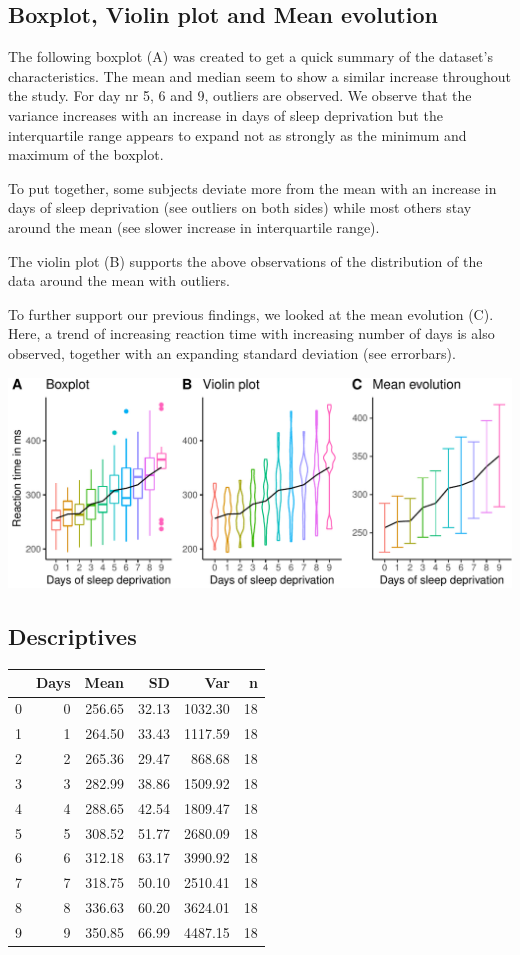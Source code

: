 \documentclass[
]{article}
\begin{document}
\hypertarget{boxplot-violin-plot-and-mean-evolution}{%
\subsection{Boxplot, Violin plot and Mean
evolution}\label{boxplot-violin-plot-and-mean-evolution}}

The following boxplot (A) was created to get a quick summary of the
dataset's characteristics. The mean and median seem to show a similar
increase throughout the study. For day nr 5, 6 and 9, outliers are
observed. We observe that the variance increases with an increase in
days of sleep deprivation but the interquartile range appears to expand
not as strongly as the minimum and maximum of the boxplot.

To put together, some subjects deviate more from the mean with an
increase in days of sleep deprivation (see outliers on both sides) while
most others stay around the mean (see slower increase in interquartile
range).

The violin plot (B) supports the above observations of the distribution
of the data around the mean with outliers.

To further support our previous findings, we looked at the mean
evolution (C). Here, a trend of increasing reaction time with increasing
number of days is also observed, together with an expanding standard
deviation (see errorbars).

\begin{center}\includegraphics{common_sleep_files/figure-latex/boxplot-1} \end{center}

\hypertarget{descriptives}{%
\subsection{Descriptives}\label{descriptives}}

\begin{longtable}[]{@{}lrrrrr@{}}
\toprule
& Days & Mean & SD & Var & n\tabularnewline
\midrule
\endhead
0 & 0 & 256.65 & 32.13 & 1032.30 & 18\tabularnewline
1 & 1 & 264.50 & 33.43 & 1117.59 & 18\tabularnewline
2 & 2 & 265.36 & 29.47 & 868.68 & 18\tabularnewline
3 & 3 & 282.99 & 38.86 & 1509.92 & 18\tabularnewline
4 & 4 & 288.65 & 42.54 & 1809.47 & 18\tabularnewline
5 & 5 & 308.52 & 51.77 & 2680.09 & 18\tabularnewline
6 & 6 & 312.18 & 63.17 & 3990.92 & 18\tabularnewline
7 & 7 & 318.75 & 50.10 & 2510.41 & 18\tabularnewline
8 & 8 & 336.63 & 60.20 & 3624.01 & 18\tabularnewline
9 & 9 & 350.85 & 66.99 & 4487.15 & 18\tabularnewline
\bottomrule
\end{longtable}
\end{document}
